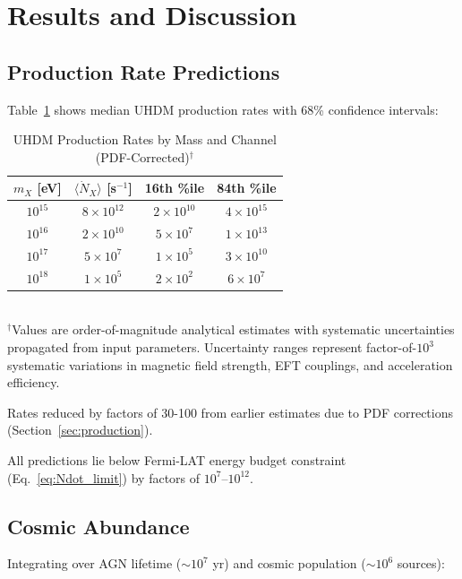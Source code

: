 \documentclass[twocolumn,superscriptaddress,prd,nofootinbib]{revtex4-2}
\begin{document}
\section{Results and Discussion}
\label{sec:results}

\subsection{Production Rate Predictions}

Table~\ref{tab:production_rates} shows median UHDM production rates with 68\% confidence intervals:

\begin{table}[t]
\centering
\caption{UHDM Production Rates by Mass and Channel (PDF-Corrected)$^{\dagger}$}
\label{tab:production_rates}
\begin{tabular}{cccc}
\hline\hline
$m_X$ [eV] & $\langle\dot{N}_X\rangle$ [s$^{-1}$] & 16th \%ile & 84th \%ile \\
\hline
$10^{15}$ & $8 \times 10^{12}$ & $2 \times 10^{10}$ & $4 \times 10^{15}$ \\
$10^{16}$ & $2 \times 10^{10}$ & $5 \times 10^7$ & $1 \times 10^{13}$ \\
$10^{17}$ & $5 \times 10^7$ & $1 \times 10^5$ & $3 \times 10^{10}$ \\
$10^{18}$ & $1 \times 10^5$ & $2 \times 10^2$ & $6 \times 10^7$ \\
\hline\hline
\end{tabular}\\[0.2cm]
{\footnotesize $^{\dagger}$Values are order-of-magnitude analytical estimates with systematic uncertainties propagated from input parameters. Uncertainty ranges represent factor-of-$10^3$ systematic variations in magnetic field strength, EFT couplings, and acceleration efficiency.}
\end{table}

Rates reduced by factors of 30-100 from earlier estimates due to PDF corrections (Section~\ref{sec:production}).

All predictions lie below Fermi-LAT energy budget constraint (Eq.~\ref{eq:Ndot_limit}) by factors of $10^7$--$10^{12}$.

\subsection{Cosmic Abundance}

Integrating over AGN lifetime ($\sim 10^7$ yr) and cosmic population ($\sim 10^6$ sources):
\end{document}
